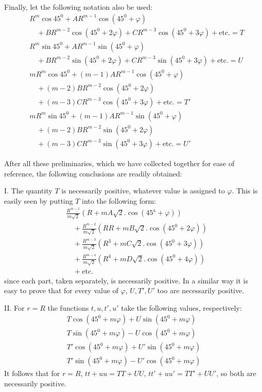 Finally, let the following notation also be used:
\[
\begin{aligned}
&R^m\cos45^0+AR^{m-1}\cos(45^0+\varphi)
\\
&\quad+BR^{m-2}\cos(45^0+2\varphi)+CR^{m-3}\cos(45^0+3\varphi)
+\mathrm{etc.}=T\\
&R^m\sin45^0+AR^{m-1}\sin(45^0+\varphi)
\\
&\quad+BR^{m-2}\sin(45^0+2\varphi)+CR^{m-3}\sin(45^0+3\varphi)
+\mathrm{etc.}=U\\
&mR^m\cos45^0+(m-1)AR^{m-1}\cos(45^0+\varphi)
\\
&\quad+(m-2)BR^{m-2}\cos(45^0+2\varphi)
\\
&\quad+(m-3)CR^{m-3}\cos(45^0+3\varphi)+\mathrm{etc.}=T'\\
&mR^m\sin45^0+(m-1)AR^{m-1}\sin(45^0+\varphi)
\\
&\quad+(m-2)BR^{m-2}\sin(45^0+2\varphi)
\\
&\quad+(m-3)CR^{m-3}\sin(45^0+3\varphi)+\mathrm{etc.}=U'
\end{aligned}
\]

After all these preliminaries, which we have collected together for ease of reference, the following conclusions are readily obtained:

I. The quantity $T$ is necessarily positive, whatever value is assigned to $\varphi$. This is easily seen by putting $T$ into the following form:
\[
\begin{aligned}
&\frac{R^{m-1}}{m\surd2}(R+mA\surd2.\cos(45^{\mathrm{a}}+\varphi))\\
&\quad+\frac{R^{m-2}}{m\surd2}(RR+mB\surd2.\cos(45^0+2\varphi))\\
&\quad+\frac{R^{m-3}}{m\surd2}(R^3+mC\surd2.\cos(45^0+3\varphi))\\
&\quad+\frac{R^{m-4}}{m\surd2}(R^4+mD\surd2.\cos(45^0+4\varphi))\\
&\quad+\mathrm{etc.}
\end{aligned}
\]
since each part, taken separately, is necessarily positive. In a similar way it is easy to prove that for every value of $\varphi$, $U,T',U'$ too are necessarily positive.

II. For $r=R$ the functions $t,u,t',u'$ take the following values, respectively:
\[
\begin{gathered}
T\cos(45^0+m\varphi)+U\sin(45^0+m\varphi)\\
T\sin(45^0+m\varphi)-U\cos(45^0+m\varphi)\\
T'\cos(45^0+m\varphi)+U'\sin(45^0+m\varphi)\\
T'\sin(45^0+m\varphi)-U'\cos(45^0+m\varphi)
\end{gathered}
\]
It follows that for $r=R$, $tt+uu=TT+UU$, $tt'+uu'=TT'+UU'$, so both are necessarily positive.

